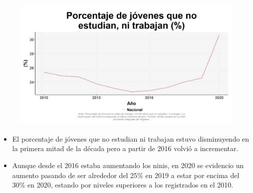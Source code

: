     \begin{figure}[H]
        \caption[Porcentaje de jóvenes que no estudian, ni trabajan a nivel nacional ]{\label{ninijov_nal_trend} }
        \begin{center}
        \includegraphics[width=\textwidth,keepaspectratio]{img/var_42_trend.png}
        \end{center}
    \end{figure}
            \begin{itemize}
                \item El porcentaje de jóvenes que no estudian ni trabajan estuvo disminuyendo en la primera mitad de la década pero a partir de 2016 volvió a incrementar.
                \item Aunque desde el 2016 estaba aumentando los ninis, en 2020 se evidencio un aumento pasando de ser alrededor del 25\% en 2019 a estar por encima del 30\% en 2020, estando por niveles superiores a los registrados en el 2010.
                \end{itemize}

